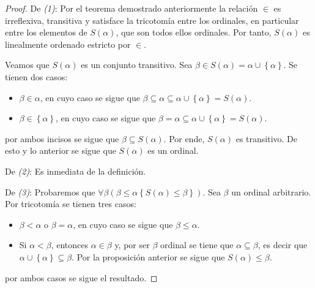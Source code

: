 \documentclass[12pt]{report}
\newcounter{it}
\theoremstyle{largebreak}
\begin{document}
    \begin{proof}
        De \textit{(1)}: Por el teorema demostrado anteriormente la relación $\in$ es irreflexiva, transitiva y satisface la tricotomía entre los ordinales, en particular entre los elementos de $S(\alpha)$, que son todos ellos ordinales. Por tanto, $S(\alpha)$ es linealmente ordenado estricto por $\in$.

        Veamos que $S(\alpha)$ es un conjunto transitivo. Sea $\beta\in S(\alpha)=\alpha\cup\left\{\alpha\right\}$. Se tienen dos casos:
        \begin{itemize}
            \item $\beta\in\alpha$, en cuyo caso se sigue que $\beta\subseteq\alpha\subseteq\alpha\cup\left\{\alpha\right\}=S(\alpha)$.
            \item $\beta\in\left\{\alpha\right\}$, en cuyo caso se sigue que $\beta=\alpha\subseteq\alpha\cup\left\{\alpha\right\}=S(\alpha)$.            
        \end{itemize}
        por ambos incisos se sigue que $\beta\subseteq S(\alpha)$. Por ende, $S(\alpha)$ es transitivo. De esto y lo anterior se sigue que $S(\alpha)$ es un ordinal.

        De \textit{(2)}: Es inmediata de la definición.

        De \textit{(3)}: Probaremos que $\forall\beta(\beta\leq\alpha\left\{S(\alpha)\leq\beta \right\})$. Sea $\beta$ un ordinal arbitrario. Por tricotomía se tienen tres casos:
        \begin{itemize}
            \item $\beta<\alpha$ o $\beta=\alpha$, en cuyo caso se sigue que $\beta\leq\alpha$.
            \item Si $\alpha<\beta$, entonces $\alpha\in\beta$ y, por ser $\beta$ ordinal se tiene que $\alpha\subseteq\beta$, es decir que $\alpha\cup\left\{\alpha\right\}\subseteq\beta$. Por la proposición anterior se sigue que $S(\alpha)\leq\beta$.
        \end{itemize}
        por ambos casos se sigue el resultado.
    \end{proof}

    
\end{document}
